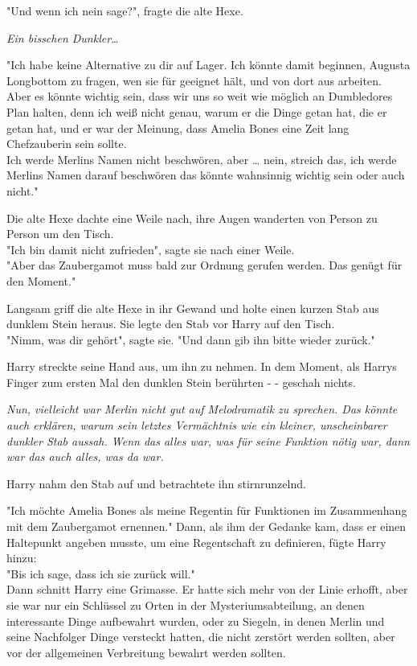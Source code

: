 {"Und wenn ich nein sage?", fragte die alte Hexe.

\emph{Ein bisschen Dunkler…}

"Ich habe keine Alternative zu dir auf Lager. Ich könnte damit beginnen, Augusta Longbottom zu fragen, wen sie für geeignet hält, und von dort aus arbeiten.\\ Aber es könnte wichtig sein, dass wir uns so weit wie möglich an Dumbledores Plan halten, denn ich weiß nicht genau, warum er die Dinge getan hat, die er getan hat, und er war der Meinung, dass Amelia Bones eine Zeit lang Chefzauberin sein sollte.\\ Ich werde Merlins Namen nicht beschwören, aber … nein, streich das, ich werde Merlins Namen darauf beschwören das könnte wahnsinnig wichtig sein oder auch nicht."

Die alte Hexe dachte eine Weile nach, ihre Augen wanderten von Person zu Person um den Tisch.\\ "Ich bin damit nicht zufrieden", sagte sie nach einer Weile.\\ "Aber das Zaubergamot muss bald zur Ordnung gerufen werden. Das genügt für den Moment."

Langsam griff die alte Hexe in ihr Gewand und holte einen kurzen Stab aus dunklem Stein heraus. Sie legte den Stab vor Harry auf den Tisch.\\ "Nimm, was dir gehört", sagte sie. "Und dann gib ihn bitte wieder zurück."

Harry streckte seine Hand aus, um ihn zu nehmen. In dem Moment, als Harrys Finger zum ersten Mal den dunklen Stein berührten - - geschah nichts.

\emph{Nun, vielleicht war Merlin nicht gut auf Melodramatik zu sprechen. Das könnte auch erklären, warum sein letztes Vermächtnis wie ein kleiner, unscheinbarer dunkler Stab aussah. Wenn das alles war, was für seine Funktion nötig war, dann war das auch alles, was da war.}

Harry nahm den Stab auf und betrachtete ihn stirnrunzelnd.

"Ich möchte Amelia Bones als meine Regentin für Funktionen im Zusammenhang mit dem Zaubergamot ernennen." Dann, als ihm der Gedanke kam, dass er einen Haltepunkt angeben musste, um eine Regentschaft zu definieren, fügte Harry hinzu:\\ "Bis ich sage, dass ich sie zurück will."\\ Dann schnitt Harry eine Grimasse. Er hatte sich mehr von der Linie erhofft, aber sie war nur ein Schlüssel zu Orten in der Mysteriumsabteilung, an denen interessante Dinge aufbewahrt wurden, oder zu Siegeln, in denen Merlin und seine Nachfolger Dinge versteckt hatten, die nicht zerstört werden sollten, aber vor der allgemeinen Verbreitung bewahrt werden sollten.

}
